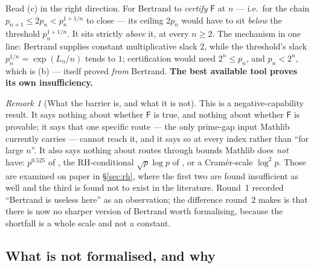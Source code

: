 \documentclass[11pt,a4paper]{article}
\theoremstyle{plain}
\theoremstyle{definition}
\theoremstyle{remark}
\newtheorem{remark}[theorem]{Remark}
\newcommand{\Fb}{\mathsf{F}}
\begin{document}
Read (c) in the right direction. For Bertrand to \emph{certify} $\Fb$ at $n$ --- i.e.\ for the
chain $p_{n+1} \le 2p_n < p_n^{1+1/n}$ to close --- its ceiling $2p_n$ would have to sit
\emph{below} the threshold $p_n^{1+1/n}$. It sits strictly \emph{above} it, at every $n \ge 2$.
The mechanism in one line: Bertrand supplies constant multiplicative slack $2$, while the
threshold's slack $p_n^{1/n} = \exp(L_n/n)$ tends to $1$; certification would need
$2^n \le p_n$, and $p_n < 2^n$, which is (b) --- itself proved \emph{from} Bertrand. \textbf{The
best available tool proves its own insufficiency.}

\begin{remark}[What the barrier is, and what it is not]
\label{rem:barrier-scope}
This is a negative-capability result. It says nothing about whether $\Fb$ is true, and nothing
about whether $\Fb$ is provable; it says that one specific route --- the only prime-gap input
Mathlib currently carries --- cannot reach it, and it says so at every index rather than
``for large $n$''. It also says nothing about routes through bounds Mathlib does \emph{not}
have: $p^{0.525}$ of \cite{baker2001difference}, the RH-conditional $\sqrt{p}\log p$ of
\cite{carneiro2019fourier}, or a Cram\'er-scale $\log^2 p$. Those are examined on paper in
\S\ref{sec:rh}, where the first two are found insufficient as well and the third is found not
to exist in the literature. Round~1 recorded ``Bertrand is useless here'' as an observation;
the difference round~2 makes is that there is now no sharper version of Bertrand worth
formalising, because the shortfall is a whole scale and not a constant.
\end{remark}

\subsection{What is not formalised, and why}
\end{document}
